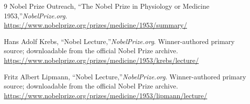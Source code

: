\begin{thebibliography}{9}
Nobel Prize Outreach, ``The Nobel Prize in Physiology or Medicine 1953,''\emph{NobelPrize.org}.\\
\url{https://www.nobelprize.org/prizes/medicine/1953/summary/}

Hans Adolf Krebs, ``Nobel Lecture,''\emph{NobelPrize.org}. Winner-authored primary source; downloadable from the official Nobel Prize archive.\\
\url{https://www.nobelprize.org/prizes/medicine/1953/krebs/lecture/}

Fritz Albert Lipmann, ``Nobel Lecture,''\emph{NobelPrize.org}. Winner-authored primary source; downloadable from the official Nobel Prize archive.\\
\url{https://www.nobelprize.org/prizes/medicine/1953/lipmann/lecture/}
\end{thebibliography}
